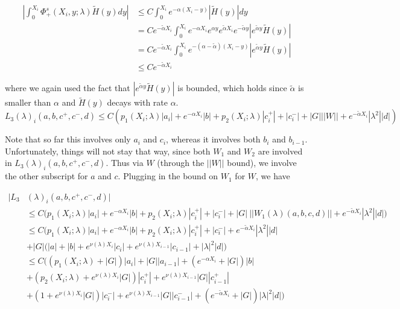 \documentclass[12pt]{article}
\begin{document}
\begin{enumerate}
\begin{align*}
\left| \int_0^{X_i} \Phi^s_+(X_i, y; \lambda) \tilde{H}(y) dy \right| 
&\leq C \int_0^{X_i} e^{-\alpha (X_i - y)}|\tilde{H}(y)| dy \\
&= C e^{-\tilde{\alpha}X_i} \int_0^{X_i} e^{-\alpha X_i} e^{\alpha y}  e^{\tilde{\alpha}X_i} e^{-\tilde{\alpha}y} |e^{\tilde{\alpha}y} \tilde{H}(y)| \\
&= C e^{-\tilde{\alpha}X_i} \int_0^{X_i} e^{-(\alpha - \tilde{\alpha})(X_i-y)} |e^{\tilde{\alpha}y} \tilde{H}(y)|\\
&\leq C e^{-\tilde{\alpha}X_i} 
\end{align*}

where we again used the fact that $|e^{\tilde{\alpha}y} \tilde{H}(y)|$ is bounded, which holds since $\tilde{\alpha}$ is smaller than $\alpha$ and $\tilde{H}(y)$ decays with rate $\alpha$.\\

\[
L_3(\lambda)_i(a, b, c^+, c^-, d) \leq C ( p_1(X_i; \lambda)|a_i|
+ e^{-\alpha X_i}|b| + p_2(X_i; \lambda)|c_i^+| + |c_i^-| + |G| ||W|| + e^{-\tilde{\alpha} X_i} |\lambda^2| |d| )
\]

Note that so far this involves only $a_i$ and $c_i$, whereas it involves both $b_i$ and $b_{i-1}$. Unfortunately, things will not stay that way, since both $W_1$ and $W_2$ are involved in $L_3(\lambda)_i(a, b, c^+, c^-, d)$. Thus via $W$ (through the $||W||$ bound), we involve the other subscript for $a$ and $c$. Plugging in the bound on $W_1$ for $W$, we have

\begin{align*}
|L_3&(\lambda)_i(a, b, c^+, c^-, d)| \\
&\leq C \Big( p_1(X_i; \lambda)|a_i|
+ e^{-\alpha X_i}|b| + p_2(X_i; \lambda)|c_i^+| + |c_i^-| + |G|\:||W_1(\lambda)(a,b,c,d)|| + e^{-\tilde{\alpha} X_i} |\lambda^2| |d| \Big) \\
& \leq C \Big( p_1(X_i; \lambda)|a_i|
+ e^{-\alpha X_i}|b| + p_2(X_i; \lambda)|c_i^+| + |c_i^-| + e^{-\tilde{\alpha} X_i} |\lambda^2| |d| \\
&+ |G| (|a| + |b| + e^{\nu(\lambda)X_i}|c_i| + e^{\nu(\lambda)X_{i-1}}|c_{i-1}| + |\lambda|^2 |d| \Big) \\
& \leq C \Big( (p_1(X_i; \lambda) + |G|)|a_i| + |G||a_{i-1}| + (e^{-\alpha X_i} + |G|) |b| \\
&+ ( p_2(X_i; \lambda) + e^{\nu(\lambda)X_i} |G|) |c_i^+| + e^{\nu(\lambda)X_{i-1}} |G| |c_{i-1}^+|   \\
&+ (1 + e^{\nu(\lambda)X_i} |G|)|c_i^-| + e^{\nu(\lambda)X_{i-1}} |G||c_{i-1}^-| + (e^{-\tilde{\alpha} X_i} + |G|) |\lambda|^2 |d| \Big)
\end{align*} 


\end{enumerate}
\end{document}
